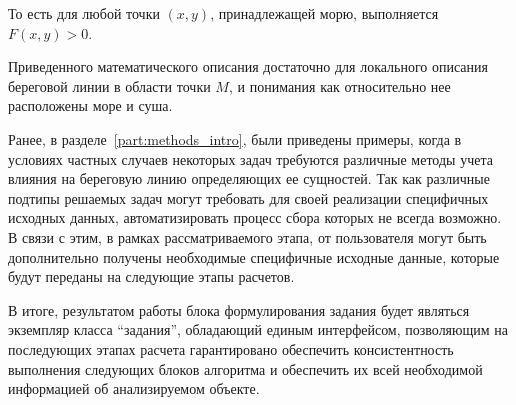 То есть для любой точки $(x,y)$, принадлежащей морю, выполняется $F(x,y)>0$.

Приведенного математического описания достаточно для локального описания береговой линии в области точки $M$, и понимания как относительно нее расположены море и суша.

Ранее, в разделе~\ref{part:methods_intro}, были приведены примеры, когда в условиях частных случаев некоторых задач требуются различные методы учета влияния на береговую линию определяющих ее сущностей.
Так как различные подтипы решаемых задач могут требовать для своей реализации специфичных исходных данных, автоматизировать процесс сбора которых не всегда возможно.
В связи с этим, в рамках рассматриваемого этапа, от пользователя могут быть дополнительно получены необходимые специфичные исходные данные, которые будут переданы на следующие этапы расчетов.

\label{sec:task_end}
В итоге, результатом работы блока формулирования задания будет являться экземпляр класса \enquote{задания}, обладающий единым интерфейсом, позволяющим на последующих этапах расчета гарантировано обеспечить консистентность выполнения следующих блоков алгоритма и обеспечить их всей необходимой информацией об анализируемом объекте.


